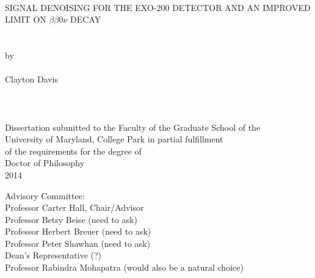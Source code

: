 
\thispagestyle{empty}
\hbox{\ }
\vspace{1in}
\renewcommand{\baselinestretch}{1}
\small\normalsize
\begin{center}

\large{{SIGNAL DENOISING FOR THE
EXO-200 DETECTOR AND AN IMPROVED LIMIT ON $\beta\beta 0\nu$ DECAY}}\\
\ \\
\ \\
\large{by} \\
\ \\
\large{Clayton Davis}%
\ \\
\ \\
\ \\
\ \\
\normalsize
Dissertation submitted to the Faculty of the Graduate School of the \\
University of Maryland, College Park in partial fulfillment \\
of the requirements for the degree of \\
Doctor of Philosophy \\
2014
\end{center}

\vspace{7.5em}

\noindent Advisory Committee: \\
Professor Carter Hall, Chair/Advisor \\
Professor Betsy Beise (need to ask) \\
Professor Herbert Breuer (need to ask) \\
Professor Peter Shawhan (need to ask) \\
Dean's Representative (?) \\
Professor Rabindra Mohapatra (would also be a natural choice)
